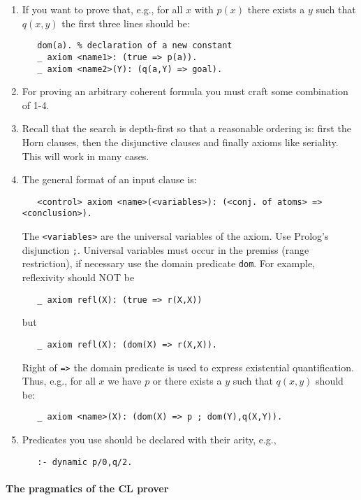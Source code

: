 \documentclass{article}
\begin{document}
\begin{enumerate}
\item If you want to prove that, e.g., for all $x$ with $p(x)$ there exists
   a $y$ such that $q(x,y)$ the first three lines should be:
\begin{verbatim}
   dom(a). % declaration of a new constant
   _ axiom <name1>: (true => p(a)).
   _ axiom <name2>(Y): (q(a,Y) => goal).
 \end{verbatim}
 \item For proving an arbitrary coherent formula you must craft some
   combination of 1-4.
 \item Recall that the search is depth-first so that a reasonable
   ordering is: first the Horn clauses, then the disjunctive clauses
   and finally axioms like seriality.  This will work in many cases.
\item The general format of an input clause is:
\begin{verbatim}
   <control> axiom <name>(<variables>): (<conj. of atoms> => <conclusion>).
\end{verbatim}
  The \texttt{<variables>} are the universal variables of the axiom.
  Use Prolog's disjunction \texttt{;}. Universal variables must occur
  in the premiss (range restriction), if necessary use the domain
  predicate \texttt{dom}. For example, reflexivity should NOT be
\begin{verbatim}
   _ axiom refl(X): (true => r(X,X)) 
\end{verbatim}
but 
\begin{verbatim}
   _ axiom refl(X): (dom(X) => r(X,X)). 
\end{verbatim}
Right of \texttt{=>} the domain predicate is used to express
existential quantification.  Thus, e.g., for all $x$ we have $p$ or
there exists a $y$ such that $q(x,y)$ should be:
\begin{verbatim}
   _ axiom <name>(X): (dom(X) => p ; dom(Y),q(X,Y)).
\end{verbatim}
\item Predicates you use should be declared with their arity, e.g.,
\begin{verbatim}
   :- dynamic p/0,q/2.
\end{verbatim}
\end{enumerate}


\paragraph{The pragmatics of the CL prover}
\end{document}
